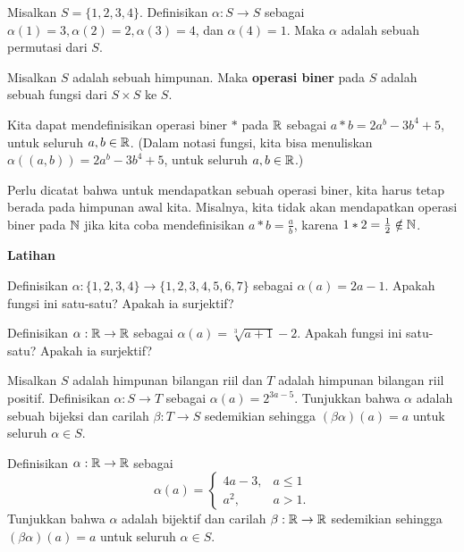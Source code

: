 \begin{exmp}
Misalkan $S = \{ 1, 2, 3, 4 \}$. Definisikan $\alpha : S \rightarrow S$ sebagai $\alpha(1) = 3, \alpha(2) = 2, \alpha(3) = 4$, dan $\alpha(4) = 1$. Maka $\alpha$ adalah sebuah permutasi dari $S$.
\end{exmp}

\begin{defn}
Misalkan $S$ adalah sebuah himpunan. Maka \textbf{operasi biner} pada $S$ adalah sebuah fungsi dari $S \times S$ ke $S$.
\end{defn}

\begin{exmp}
Kita dapat mendefinisikan operasi biner $*$ pada $\mathbb{R}$ sebagai $a * b = 2a^b - 3b^4 + 5$, untuk seluruh $a,b \in \mathbb{R}$. (Dalam notasi fungsi, kita bisa menuliskan $\alpha((a,b)) = 2a^b - 3b^4 + 5$, untuk seluruh $a,b \in \mathbb{R}$.)
\end{exmp}

Perlu dicatat bahwa untuk mendapatkan sebuah operasi biner, kita harus tetap berada pada himpunan awal kita. Misalnya, kita tidak akan mendapatkan operasi biner pada $\mathbb{N}$ jika kita coba mendefinisikan $a * b = \frac{a}{b}$, karena $1* 2 = \frac{1}{2} \notin \mathbb{N}$.
\hfill \break 


\textbf{Latihan}

\begin{exc}
Definisikan $\alpha : \{ 1, 2, 3, 4 \} \rightarrow \{ 1, 2, 3, 4, 5, 6, 7 \}$ sebagai $\alpha(a) = 2a - 1$. Apakah fungsi ini satu-satu? Apakah ia surjektif?
\end{exc}

\begin{exc}
Definisikan $\alpha : \mathbb{R} \rightarrow \mathbb{R}$ sebagai $\alpha(a) = \sqrt[3]{a+1} - 2$. Apakah fungsi ini satu-satu? Apakah ia surjektif?
\end{exc}

\begin{exc}
Misalkan $S$ adalah himpunan bilangan riil dan $T$ adalah himpunan bilangan riil positif. Definisikan $\alpha : S \rightarrow T$ sebagai $\alpha(a) = 2^{3a-5}$. Tunjukkan bahwa $\alpha$ adalah sebuah bijeksi dan carilah $\beta : T \rightarrow S$ sedemikian sehingga $(\beta \alpha)(a) = a$ untuk seluruh $\alpha \in S$.
\end{exc}

\begin{exc}
Definisikan $\alpha : \mathbb{R} \rightarrow \mathbb{R}$ sebagai
\[ \alpha(a) = 
  \begin{cases}
    4a - 3, & a \leq 1 \\
    a^2, & a > 1.
  \end{cases}
\]
Tunjukkan bahwa $\alpha$ adalah bijektif dan carilah $\beta : \mathbb{R} \rightarrow \mathbb{R}$ sedemikian sehingga $(\beta \alpha)(a) = a$ untuk seluruh $\alpha \in S$.
\end{exc}

